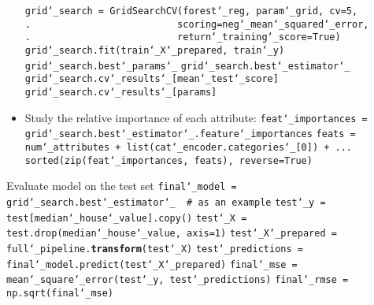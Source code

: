 \begin{itemize}
\texttt{grid\char`_search = GridSearchCV(forest\char`_reg, param\char`_grid, cv=5,}\newline
\texttt{.~~~~~~~~~~~~~~~~~~~~~~~~~~scoring=\textquotesingle neg\char`_mean\char`_squared\char`_error\textquotesingle,}\newline
\texttt{.~~~~~~~~~~~~~~~~~~~~~~~~~~return\char`_training\char`_score=True)}\newline
\texttt{grid\char`_search.fit(train\char`_X\char`_prepared, train\char`_y)}\newline
\newline
\texttt{grid\char`_search.best\char`_params\char`_}\newline
\texttt{grid\char`_search.best\char`_estimator\char`_}\newline
\texttt{grid\char`_search.cv\char`_results\char`_[\textquotesingle mean\char`_test\char`_score\textquotesingle]}\newline
\texttt{grid\char`_search.cv\char`_results\char`_[\textquotesingle params\textquotesingle]}
\item
Study the relative importance of each attribute:\newline
\texttt{feat\char`_importances = grid\char`_search.best\char`_estimator\char`_.feature\char`_importances}\newline
\texttt{feats = num\char`_attributes + list(cat\char`_encoder.categories\char`_[0]) + ...}\newline
\texttt{sorted(zip(feat\char`_importances, feats), reverse=True)}
\end{itemize}

Evaluate model on the test set\newline
\texttt{final\char`_model = grid\char`_search.best\char`_estimator\char`_ ~\# as an example}\newline
\texttt{test\char`_y = test[\textquotesingle median\char`_house\char`_value\textquotesingle].copy()}\newline
\texttt{test\char`_X = test.drop(\textquotesingle median\char`_house\char`_value\textquotesingle, axis=1)}\newline
\texttt{test\char`_X\char`_prepared = full\char`_pipeline.\textbf{transform}(test\char`_X)}\newline
\texttt{test\char`_predictions = final\char`_model.predict(test\char`_X\char`_prepared)}\newline
\texttt{final\char`_mse = mean\char`_square\char`_error(test\char`_y, test\char`_predictions)}\newline
\texttt{final\char`_rmse = np.sqrt(final\char`_mse)}\newline

